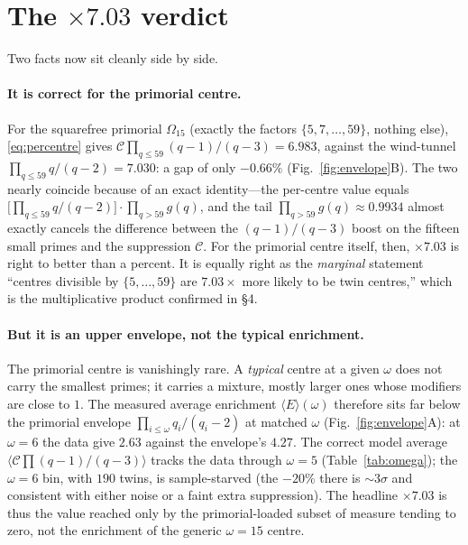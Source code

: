 \documentclass[11pt]{article}
\theoremstyle{definition}
\begin{document}
\section{The $\times7.03$ verdict}
Two facts now sit cleanly side by side.

\paragraph{It is correct for the primorial centre.} For the squarefree primorial $\Omega_{15}$ (exactly the
factors $\{5,7,\dots,59\}$, nothing else), \eqref{eq:percentre} gives
$\mathcal{C}\prod_{q\le59}(q-1)/(q-3)=6.983$, against the wind-tunnel $\prod_{q\le59}q/(q-2)=7.030$: a gap of
only $-0.66\%$ (Fig.~\ref{fig:envelope}B). The two nearly coincide because of an exact identity---the
per-centre value equals $\big[\prod_{q\le59}q/(q-2)\big]\cdot\prod_{q>59}g(q)$, and the tail
$\prod_{q>59}g(q)\approx0.9934$ almost exactly cancels the difference between the $(q-1)/(q-3)$ boost on the
fifteen small primes and the suppression $\mathcal{C}$. For the primorial centre itself, then, $\times7.03$ is
right to better than a percent. It is equally right as the \emph{marginal} statement ``centres divisible by
$\{5,\dots,59\}$ are $7.03\times$ more likely to be twin centres,'' which is the multiplicative product
confirmed in \S4.

\paragraph{But it is an upper envelope, not the typical enrichment.} The primorial centre is vanishingly rare.
A \emph{typical} centre at a given $\omega$ does not carry the smallest primes; it carries a mixture, mostly
larger ones whose modifiers are close to $1$. The measured average enrichment $\langle E\rangle(\omega)$ therefore
sits far below the primorial envelope $\prod_{i\le\omega}q_i/(q_i-2)$ at matched $\omega$
(Fig.~\ref{fig:envelope}A): at $\omega=6$ the data give $2.63$ against the envelope's $4.27$. The correct
model average $\langle\mathcal{C}\prod(q-1)/(q-3)\rangle$ tracks the data through $\omega=5$
(Table~\ref{tab:omega}); the $\omega=6$ bin, with $190$ twins, is sample-starved (the $-20\%$ there is
$\sim\!3\sigma$ and consistent with either noise or a faint extra suppression). The headline $\times7.03$ is
thus the value reached only by the primorial-loaded subset of measure tending to zero, not the enrichment of
the generic $\omega=15$ centre.
\end{document}
